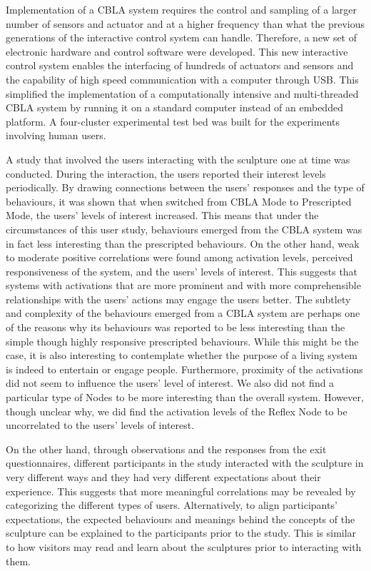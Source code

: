 Implementation of a CBLA system requires the control and sampling of a larger number of sensors and actuator and at a higher frequency than what the previous generations of the interactive control system can handle. Therefore, a new set of electronic hardware and control software were developed. This new interactive control system enables the interfacing of hundreds of actuators and sensors and the capability of high speed communication with a computer through USB. This simplified the implementation of a computationally intensive and multi-threaded CBLA system by running it on a standard computer instead of an embedded platform. A four-cluster experimental test bed was built for the experiments involving human users.

A study that involved the users interacting with the sculpture one at time was conducted. During the interaction, the users reported their interest levels periodically. By drawing connections between the users' responses and the type of behaviours, it was shown that when switched from CBLA Mode to Prescripted Mode, the users' levels of interest increased. This means that under the circumstances of this user study, behaviours emerged from the CBLA system was in fact less interesting than the prescripted behaviours. On the other hand, weak to moderate positive correlations were found among activation levels, perceived responsiveness of the system, and the users' levels of interest. This suggests that systems with activations that are more prominent and with more comprehensible relationships with the users' actions may engage the users better. The subtlety and complexity of the behaviours emerged from a CBLA system are perhaps one of the reasons why its behaviours was reported to be less interesting than the simple though highly responsive prescripted behaviours. While this might be the case, it is also interesting to contemplate whether the purpose of a living system is indeed to entertain or engage people. Furthermore, proximity of the activations did not seem to influence the users' level of interest. We also did not find a particular type of Nodes to be more interesting than the overall system. However, though unclear why, we did find the activation levels of the Reflex Node to be uncorrelated to the users' levels of interest. 

On the other hand, through observations and the responses from the exit questionnaires, different participants in the study interacted with the sculpture in very different ways and they had very different expectations about their experience. This suggests that more meaningful correlations may be revealed by categorizing the different types of users. Alternatively, to align participants' expectations, the expected behaviours and meanings behind the concepts of the sculpture can be explained to the participants prior to the study. This is similar to how visitors may read and learn about the sculptures prior to interacting with them. 
 
